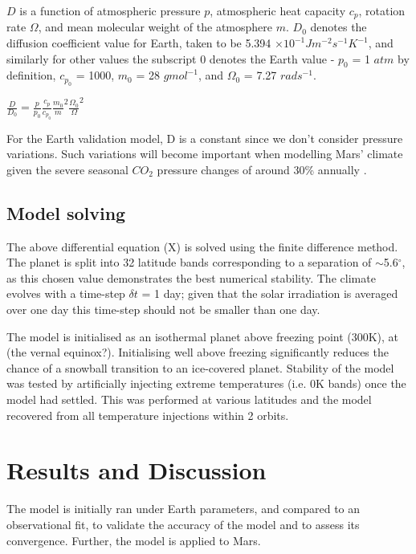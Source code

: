 \documentclass[12pt,onecolumn]{revtex4-2}    %
\begin{document}
$D$ is a function of atmospheric pressure $p$, atmospheric heat capacity $c_{p}$, rotation rate $\Omega$, and mean molecular weight of the atmosphere $m$. $D_{0}$ denotes the diffusion coefficient value for Earth, taken to be 5.394 $\times 10^{-1} J m^{-2} s^{-1} K^{-1}$, and similarly for other values the subscript 0 denotes the Earth value - $p_{0}$ = 1 $atm$ by definition, $c_{p_{0}}$ = 1000, $m_{0}$ = 28 $g mol^{-1}$, and $\Omega_{0}$ = 7.27 $rad s^{-1}$.

\begin{center}
$\frac{D}{D_{0}} = \frac{p}{p_{0}} \frac{c_{p}}{c_{p_{0}}} {\frac{m_{0}}{m}}^{2} {\frac{\Omega_{0}}{\Omega}}^{2}$
\end{center}

For the Earth validation model, D is a constant since we don't consider pressure variations. Such variations will become important when modelling Mars' climate given the severe seasonal $CO_{2}$ pressure changes of around 30\% annually \cite{FHT98}.

\subsection{Model solving}
The above differential equation (X) is solved using the finite difference method. The planet is split into 32 latitude bands corresponding to a separation of $\sim$5.6$^{\circ}$, as this chosen value demonstrates the best numerical stability. The climate evolves with a time-step $\delta t$ = 1 day; given that the solar irradiation is averaged over one day this time-step should not be smaller than one day.


The model is initialised as an isothermal planet above freezing point (300K), at (the vernal equinox?). Initialising well above freezing significantly reduces the chance of a snowball transition to an ice-covered planet. Stability of the model was tested by artificially injecting extreme temperatures (i.e. 0K bands) once the model had settled. This was performed at various latitudes and the model recovered from all temperature injections within 2 orbits. %

\section{Results and Discussion}
The model is initially ran under Earth parameters, and compared to an observational fit, to validate the accuracy of the model and to assess its convergence. Further, the model is applied to Mars.
\end{document}
